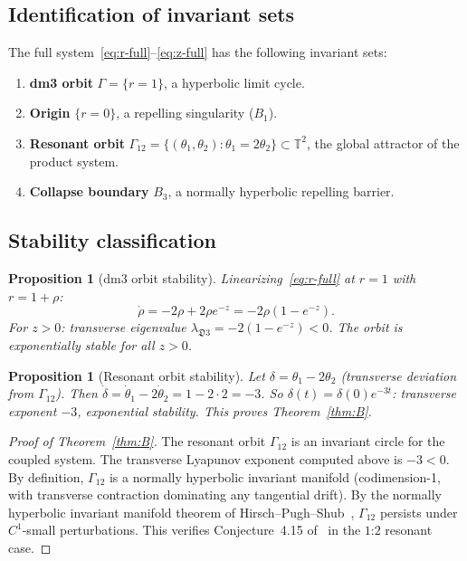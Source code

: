 \documentclass[12pt, oneside]{book}
\theoremstyle{plain}
\newtheorem{proposition}[theorem]{Proposition}
\theoremstyle{definition}
\theoremstyle{remark}
\newcommand{\T}{\mathbb{T}}
\newcommand{\dm}{\mathfrak{D}}
\newcommand{\Orb}{\Gamma}
\begin{document}
\subsection{Identification of invariant sets}

The full system~\eqref{eq:r-full}--\eqref{eq:z-full}
has the following invariant sets:

\begin{enumerate}[label=(\arabic*)]
  \item \textbf{dm3 orbit} $\Orb=\{r=1\}$, a hyperbolic limit cycle.
  \item \textbf{Origin} $\{r=0\}$, a repelling singularity ($B_1$).
  \item \textbf{Resonant orbit} $\Orb_{12}=\{(\theta_1,\theta_2):
        \theta_1=2\theta_2\}\subset\T^2$, the global attractor
        of the product system.
  \item \textbf{Collapse boundary} $B_3$, a normally hyperbolic
        repelling barrier.
\end{enumerate}

\subsection{Stability classification}

\begin{proposition}[dm3 orbit stability]\label{prop:dm3stable}
Linearizing~\eqref{eq:r-full} at $r=1$ with $r=1+\rho$:
\[
  \dot\rho = -2\rho + 2\rho e^{-z} = -2\rho(1-e^{-z}).
\]
For $z>0$: transverse eigenvalue $\lambda_{\dm3}=-2(1-e^{-z})<0$.
The orbit is exponentially stable for all $z>0$.
\end{proposition}

\begin{proposition}[Resonant orbit stability]\label{prop:resstable}
Let $\delta=\theta_1-2\theta_2$ (transverse deviation from $\Orb_{12}$).
Then $\dot\delta=\dot\theta_1-2\dot\theta_2=1-2\cdot 2=-3$.
So $\delta(t)=\delta(0)e^{-3t}$: transverse exponent $-3$,
exponential stability. This proves Theorem~\ref{thm:B}.
\end{proposition}

\begin{proof}[Proof of Theorem~\ref{thm:B}]
The resonant orbit $\Orb_{12}$ is an invariant circle for the coupled
system. The transverse Lyapunov exponent computed above is $-3<0$.
By definition, $\Orb_{12}$ is a normally hyperbolic invariant manifold
(codimension-1, with transverse contraction dominating any tangential
drift). By the normally hyperbolic invariant manifold theorem of
Hirsch--Pugh--Shub~\cite{HPS}, $\Orb_{12}$ persists under
$C^1$-small perturbations. This verifies Conjecture~4.15
of~\cite{Paper1} in the $1$:$2$ resonant case.
\end{proof}
\end{document}
